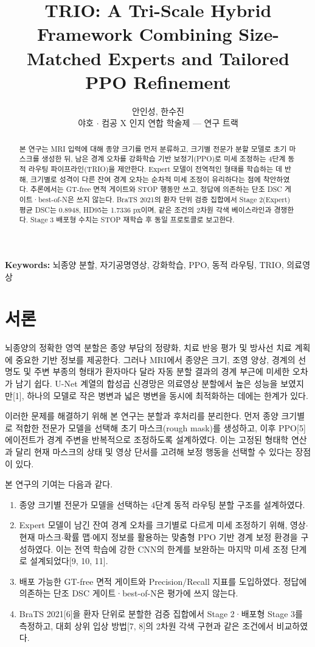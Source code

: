 \documentclass[11pt,a4paper]{article}
\title{TRIO: A Tri-Scale Hybrid Framework Combining Size-Matched Experts and Tailored PPO Refinement}
\author{안인성, 한수진 \\
\normalsize 야호 $\cdot$ 컴공 X 인지 연합 학술제 --- 연구 트랙}
\date{}
\begin{document}
\maketitle

\begin{abstract}
본 연구는 MRI 입력에 대해 종양 크기를 먼저 분류하고, 크기별 전문가 분할 모델로 초기 마스크를 생성한 뒤, 남은 경계 오차를 강화학습 기반 보정기(PPO)로 미세 조정하는 4단계 동적 라우팅 파이프라인(TRIO)을 제안한다. Expert 모델이 전역적인 형태를 학습하는 데 반해, 크기별로 성격이 다른 잔여 경계 오차는 순차적 미세 조정이 유리하다는 점에 착안하였다. 추론에서는 GT-free 면적 게이트와 STOP 행동만 쓰고, 정답에 의존하는 단조 DSC 게이트·best-of-N은 쓰지 않는다. BraTS 2021의 환자 단위 검증 집합에서 Stage 2(Expert) 평균 DSC는 0.8948, HD95는 1.7336 px이며, 같은 조건의 2차원 각색 베이스라인과 경쟁한다. Stage 3 배포형 수치는 STOP 재학습 후 동일 프로토콜로 보고한다.
\end{abstract}

\noindent\textbf{Keywords:} 뇌종양 분할, 자기공명영상, 강화학습, PPO, 동적 라우팅, TRIO, 의료영상

\section{서론}
뇌종양의 정확한 영역 분할은 종양 부담의 정량화, 치료 반응 평가 및 방사선 치료 계획에 중요한 기반 정보를 제공한다. 그러나 MRI에서 종양은 크기, 조영 양상, 경계의 선명도 및 주변 부종의 형태가 환자마다 달라 자동 분할 결과의 경계 부근에 미세한 오차가 남기 쉽다. U-Net 계열의 합성곱 신경망은 의료영상 분할에서 높은 성능을 보였지만[1], 하나의 모델로 작은 병변과 넓은 병변을 동시에 최적화하는 데에는 한계가 있다.

이러한 문제를 해결하기 위해 본 연구는 분할과 후처리를 분리한다. 먼저 종양 크기별로 적합한 전문가 모델을 선택해 초기 마스크(rough mask)를 생성하고, 이후 PPO[5] 에이전트가 경계 주변을 반복적으로 조정하도록 설계하였다. 이는 고정된 형태학 연산과 달리 현재 마스크의 상태 및 영상 단서를 고려해 보정 행동을 선택할 수 있다는 장점이 있다.

본 연구의 기여는 다음과 같다.
\begin{enumerate}
    \item 종양 크기별 전문가 모델을 선택하는 4단계 동적 라우팅 분할 구조를 설계하였다.
    \item Expert 모델이 남긴 잔여 경계 오차를 크기별로 다르게 미세 조정하기 위해, 영상$\cdot$현재 마스크$\cdot$확률 맵$\cdot$에지 정보를 활용하는 맞춤형 PPO 기반 경계 보정 환경을 구성하였다. 이는 전역 학습에 강한 CNN의 한계를 보완하는 마지막 미세 조정 단계로 설계되었다[9, 10, 11].
    \item 배포 가능한 GT-free 면적 게이트와 Precision/Recall 지표를 도입하였다. 정답에 의존하는 단조 DSC 게이트·best-of-N은 평가에 쓰지 않는다.
    \item BraTS 2021[6]을 환자 단위로 분할한 검증 집합에서 Stage 2·배포형 Stage 3를 측정하고, 대회 상위 입상 방법[7, 8]의 2차원 각색 구현과 같은 조건에서 비교하였다.
\end{enumerate}
\end{document}
